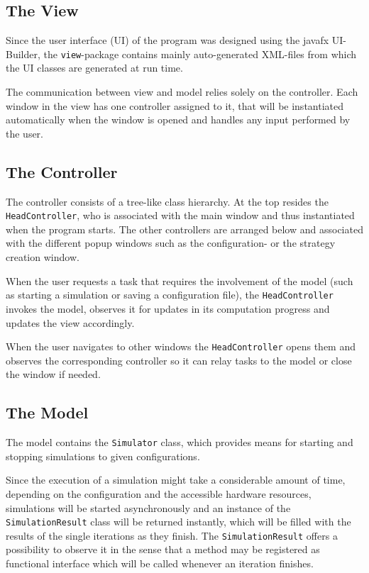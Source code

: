 \documentclass[parskip=full,11pt]{scrartcl}
\begin{document}
\subsection{The View}
Since the user interface (UI) of the program was designed using the javafx UI-Builder, the \texttt{view}-package contains mainly auto-generated XML-files from which the UI classes are generated at run time.

The communication between view and model relies solely on the controller. Each window in the view has one controller assigned to it, that will be instantiated automatically when the window is opened and handles any input performed by the user.

\subsection{The Controller}
The controller consists of a tree-like class hierarchy. At the top resides the \texttt{HeadController}, who is associated with the main window and thus instantiated when the program starts. The other controllers are arranged below and associated with the different popup windows such as the configuration- or the strategy creation window.

When the user requests a task that requires the involvement of the model (such as starting a simulation or saving a configuration file), the \texttt{HeadController} invokes the model, observes it for updates in its computation progress and updates the view accordingly.

When the user navigates to other windows the \texttt{HeadController} opens them and observes the corresponding controller so it can relay tasks to the model or close the window if needed.

\subsection{The Model}
The model contains the \texttt{Simulator} class, which provides means for starting and stopping simulations to given configurations.

Since the execution of a simulation might take a considerable amount of time, depending on the configuration and the accessible hardware resources, simulations will be started asynchronously and an instance of the \texttt{SimulationResult} class will be returned instantly, which will be filled with the results of the single iterations as they finish. The \texttt{SimulationResult} offers a possibility to observe it in the sense that a method may be registered as functional interface which will be called whenever an iteration finishes.
\end{document}
